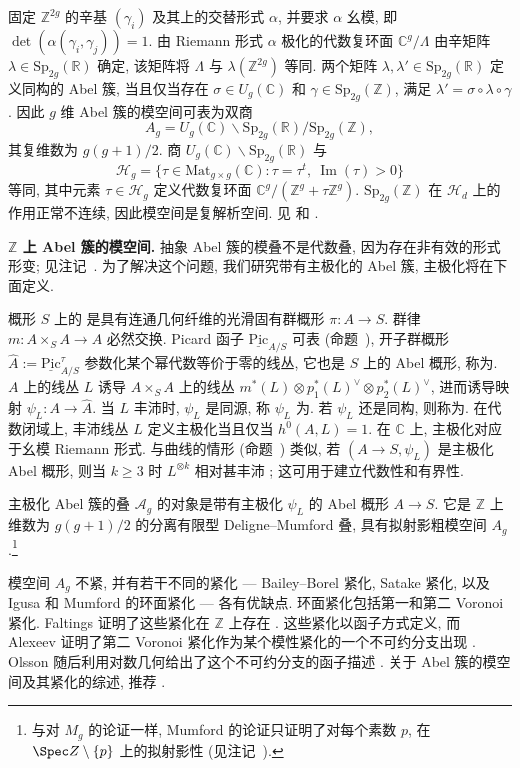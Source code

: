 固定 $\mathbb Z^{2g}$ 的辛基 $(\gamma_i)$ 及其上的交替形式 $\alpha$, 并要求 $\alpha$ 幺模, 即 $\det(\alpha(\gamma_i,\gamma_j))=1$. 由 Riemann 形式 $\alpha$ 极化的代数复环面 $\mathbb C^g/\Lambda$ 由辛矩阵 $\lambda\in\mathrm{Sp}_{2g}(\mathbb R)$ 确定, 该矩阵将 $\Lambda$ 与 $\lambda(\mathbb Z^{2g})$ 等同. 两个矩阵 $\lambda,\lambda'\in\mathrm{Sp}_{2g}(\mathbb R)$ 定义同构的 Abel 簇, 当且仅当存在 $\sigma\in U_g(\mathbb C)$ 和 $\gamma\in\mathrm{Sp}_{2g}(\mathbb Z)$, 满足 $\lambda'=\sigma\circ\lambda\circ\gamma$. 因此 $g$ 维 Abel 簇的模空间可表为双商
\[
A_g=U_g(\mathbb C)\backslash\mathrm{Sp}_{2g}(\mathbb R)/\mathrm{Sp}_{2g}(\mathbb Z),
\]
其复维数为 $g(g+1)/2$. 商 $U_g(\mathbb C)\backslash\mathrm{Sp}_{2g}(\mathbb R)$ 与 
\[
\mathcal H_g=\{\tau\in\mathrm{Mat}_{g\times g}(\mathbb C):\tau=\tau^t,\ \operatorname{Im}(\tau)>0\}
\]
等同, 其中元素 $\tau\in\mathcal H_g$ 定义代数复环面 $\mathbb C^g/(\mathbb Z^g+\tau\mathbb Z^g)$. $\mathrm{Sp}_{2g}(\mathbb Z)$ 在 $\mathcal H_d$ 上的作用正常不连续, 因此模空间是复解析空间. 见 \cite[\S II.4]{Mum07} 和 \cite[\S10]{Gee08}.

\textbf{\texorpdfstring{$\mathbb Z$}{Z} 上 Abel 簇的模空间.} 抽象 Abel 簇的模叠不是代数叠, 因为存在非有效的形式形变; 见注记~. 为了解决这个问题, 我们研究带有主极化的 Abel 簇, 主极化将在下面定义.

概形 $S$ 上的 是具有连通几何纤维的光滑固有群概形 $\pi:A\to S$. 群律 $m:A\times_S A\to A$ 必然交换. Picard 函子 $\underline{\mathrm{Pic}}_{A/S}$ 可表 (命题~), 开子群概形 $\widehat A:=\underline{\mathrm{Pic}}_{A/S}^\tau$ 参数化某个幂代数等价于零的线丛, 它也是 $S$ 上的 Abel 概形, 称为. $A$ 上的线丛 $L$ 诱导 $A\times_S A$ 上的线丛 $m^*(L)\otimes p_1^*(L)^\vee\otimes p_2^*(L)^\vee$, 进而诱导映射 $\psi_L:A\to\widehat A$. 当 $L$ 丰沛时, $\psi_L$ 是同源, 称 $\psi_L$ 为. 若 $\psi_L$ 还是同构, 则称为. 在代数闭域上, 丰沛线丛 $L$ 定义主极化当且仅当 $h^0(A,L)=1$. 在 $\mathbb C$ 上, 主极化对应于幺模 Riemann 形式. 与曲线的情形 (命题~) 类似, 若 $(A\to S,\psi_L)$ 是主极化 Abel 概形, 则当 $k\geq3$ 时 $L^{\otimes k}$ 相对甚丰沛 \cite[定理 6.13]{GIT}; 这可用于建立代数性和有界性.

主极化 Abel 簇的叠 $\mathcal A_g$ 的对象是带有主极化 $\psi_L$ 的 Abel 概形 $A\to S$. 它是 $\mathbb Z$ 上维数为 $g(g+1)/2$ 的分离有限型 Deligne--Mumford 叠, 具有拟射影粗模空间 $A_g$ \cite[定理 7.10]{GIT}.\footnote{与对 $M_g$ 的论证一样, Mumford 的论证只证明了对每个素数 $p$, 在 $\Spec\mathbb Z\setminus\{p\}$ 上的拟射影性 (见注记~).}

模空间 $A_g$ 不紧, 并有若干不同的紧化 --- Bailey--Borel 紧化, Satake 紧化, 以及 Igusa 和 Mumford 的环面紧化 --- 各有优缺点. 环面紧化包括第一和第二 Voronoi 紧化. Faltings 证明了这些紧化在 $\mathbb Z$ 上存在 \cite{FC90}. 这些紧化以函子方式定义, 而 Alexeev 证明了第二 Voronoi 紧化作为某个模性紧化的一个不可约分支出现 \cite{Ale02}. Olsson 随后利用对数几何给出了这个不可约分支的函子描述 \cite{Ols08}. 关于 Abel 簇的模空间及其紧化的综述, 推荐 \cite{GO99,Gru09}.
